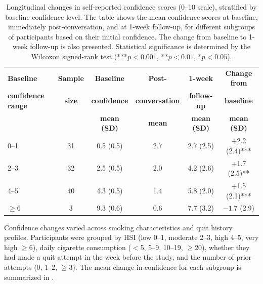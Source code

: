 \begin{table}[ht!]
	\centering
	\small
	\renewcommand{\arraystretch}{1.1}
	\begin{tabular*}{\linewidth}{@{\extracolsep{\fill}}lccccc@{}}
		\toprule
		\textbf{Baseline} & \textbf{Sample} & \textbf{Baseline} & \textbf{Post-} & \textbf{1-week} & \textbf{Change from} \\
		\textbf{confidence range} & \textbf{size} & \textbf{confidence} & \textbf{conversation} & \textbf{follow-up} & \textbf{baseline} \\
		& & \textbf{mean (SD)} & \textbf{mean} & \textbf{mean (SD)} & \textbf{mean (SD)} \\
		\midrule
		0--1   & 31 & 0.5 (0.5) & 2.7 & 2.7 (2.5) & +2.2 (2.4)*** \\
		2--3   & 32 & 2.5 (0.5) & 2.0 & 4.2 (2.6) & +1.7 (2.5)** \\
		4--5   & 40 & 4.3 (0.5) & 1.4 & 5.8 (2.0) & +1.5 (2.1)*** \\
		$\geq$6 & 3 & 9.3 (0.6) & 0.6 & 7.7 (3.2) & $-1.7$ (2.9) \\
		\bottomrule
	\end{tabular*}
	\caption[Confidence Changes by Baseline Confidence]{Longitudinal changes in self-reported confidence scores (0--10 scale), stratified by baseline confidence level. The table shows the mean confidence scores at baseline, immediately post-conversation, and at 1-week follow-up, for different subgroups of participants based on their initial confidence. The change from baseline to 1-week follow-up is also presented. Statistical significance is determined by the Wilcoxon signed-rank test (***$p < 0.001$, **$p < 0.01$, *$p < 0.05$).}
	\label{tab:baseline_confidence}
\end{table}




Confidence changes varied across smoking characteristics and quit history profiles. Participants were grouped by HSI (low 0--1, moderate 2--3, high 4--5, very high $\geq$6), daily cigarette consumption ($<$5, 5--9, 10--19, $\geq$20), whether they had made a quit attempt in the week before the study, and the number of prior attempts (0, 1--2, $\geq$3). The mean change in confidence for each subgroup is summarized in .

